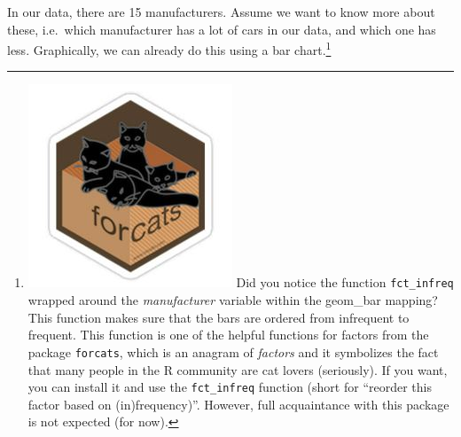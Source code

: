 \documentclass[]{tufte-book}
\newenvironment{Shaded}{}{}
\newcommand{\DataTypeTok}[1]{\textcolor[rgb]{0.56,0.13,0.00}{#1}}
\newcommand{\DecValTok}[1]{\textcolor[rgb]{0.25,0.63,0.44}{#1}}
\newcommand{\KeywordTok}[1]{\textcolor[rgb]{0.00,0.44,0.13}{\textbf{#1}}}
\newcommand{\NormalTok}[1]{#1}
\newcommand{\OperatorTok}[1]{\textcolor[rgb]{0.40,0.40,0.40}{#1}}
\newcommand{\StringTok}[1]{\textcolor[rgb]{0.25,0.44,0.63}{#1}}
\begin{document}
In our data, there are 15 manufacturers. Assume we want to know more about these, i.e.~which manufacturer has a lot of cars in our data, and which one has less. Graphically, we can already do this using a bar chart.\footnote{\includegraphics{images/forcats.jpg} Did you notice the function \texttt{fct\_infreq} wrapped around the \emph{manufacturer} variable within the geom\_bar mapping? This function makes sure that the bars are ordered from infrequent to frequent. This function is one of the helpful functions for factors from the package \texttt{forcats}, which is an anagram of \emph{factors} and it symbolizes the fact that many people in the R community are cat lovers (seriously). If you want, you can install it and use the \texttt{fct\_infreq} function (short for ``reorder this factor based on (in)frequency)''. However, full acquaintance with this package is not expected (for now).}

\begin{Shaded}
\end{Shaded}
\end{document}
